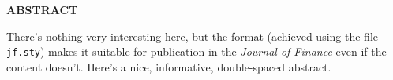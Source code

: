 \centerline{\bf ABSTRACT}

\begin{doublespace}  %
  \noindent There's nothing very interesting here, but the format (achieved using the file \texttt{jf.sty}) makes it suitable for publication in the \emph{Journal of Finance} even if the content doesn't. Here's a nice, informative, double-spaced abstract.
\end{doublespace}